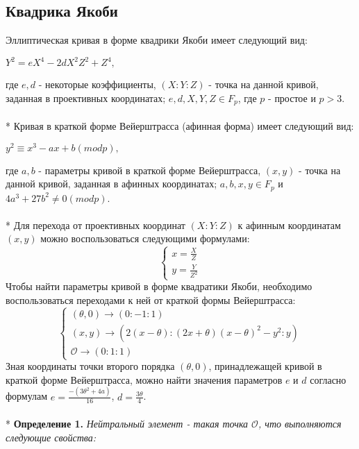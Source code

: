\documentclass[12pt]{article}
\begin{document}
\subsection{Квадрика Якоби}
Эллиптическая кривая в форме квадрики Якоби имеет следующий вид:
\begin{center}
$Y^2 = eX^4 - 2dX^2Z^2 + Z^4,$
\end{center}
где $e, d$ - некоторые коэффициенты, $(X : Y : Z)$ - точка на данной кривой, заданная в проективных координатах; $e, d, X, Y, Z \in F_p$, где $p$ - простое и $p > 3$. \\
\\*
Кривая в краткой форме Вейерштрасса (афинная форма) имеет следующий вид:
\begin{center}
$y^2 \equiv x^3 - ax + b (mod p),$
\end{center}
где $a, b$ - параметры кривой в краткой форме Вейерштрасса, $(x, y)$ - точка на данной кривой, заданная в афинных координатах; $a, b, x, y \in F_p$ и $4a^3 + 27b^2 \neq 0 (mod p)$.\\
\\*
Для перехода от проективных координат $(X : Y : Z)$ к афинным координатам $(x, y)$ можно воспользоваться следующими формулами: \\
\begin{equation*}
\begin{cases}
x = \frac{X}{Z}
\\
y = \frac{Y}{Z^2}
\end{cases}
\end{equation*}
Чтобы найти параметры кривой в форме квадратики Якоби, необходимо воспользоваться переходами к ней от краткой формы Вейерштрасса:
\begin{equation*}
\begin{cases}
(\theta, 0) \rightarrow (0 : -1 : 1)
\\
(x, y) \rightarrow (2(x - \theta) : (2x + \theta)(x - \theta)^2 - y^2 : y)
\\
\mathcal{O} \rightarrow (0 : 1 : 1)
\end{cases}
\end{equation*}
Зная координаты точки второго порядка $(\theta, 0)$, принадлежащей кривой в краткой форме Вейерштрасса, можно найти значения параметров $e$ и $d$ согласно формулам $e = \frac{-(3\theta^2 + 4a)}{16}$, $d = \frac{3\theta}{4}$.\\
\\*
\textbf{Определение 1.} \textit{Нейтральный элемент - такая точка $\mathcal{O}$, что выполняются следующие свойства:}
\end{document}
